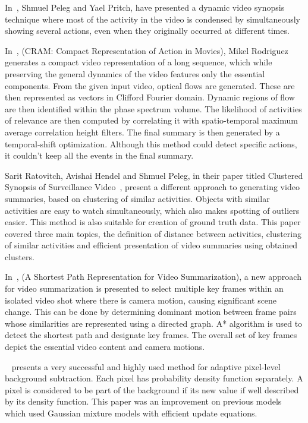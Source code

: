 In~\cite{pritch2008nonchronological}, Shmuel Peleg and Yael Pritch, have
presented a dynamic video synopsis technique where most of the activity in the
video is condensed by simultaneously showing several actions, even when they
originally occurred at different times.

In~\cite{rodriguez2010cram}, (CRAM: Compact Representation of Action in Movies),
Mikel Rodriguez generates a compact video representation of a long sequence,
which while preserving the general dynamics of the video features only the
essential components. From the given input video, optical flows are generated.
These are then represented as vectors in Clifford Fourier domain. Dynamic
regions of flow are then identified within the phase spectrum volume. The
likelihood of activities of relevance are then computed by correlating it with
spatio-temporal maximum average correlation height filters. The final summary
is then generated by a temporal-shift optimization. Although this method could
detect specific actions, it couldn’t keep all the events in the final summary.

Sarit Ratovitch, Avishai Hendel and Shmuel Peleg, in their paper titled
Clustered Synopsis of Surveillance Video~\cite{pritch2009clustered}, present a
different approach to generating video summaries, based on clustering of
similar activities. Objects with similar activities are easy to watch
simultaneously, which also makes spotting of outliers easier. This method is
also suitable for creation of ground truth data. This paper covered three main
topics, the definition of distance between activities, clustering of similar
activities and efficient presentation of video summaries using obtained
clusters.

In~\cite{porter2003shortest}, (A Shortest Path Representation for Video
Summarization), a new approach for video summarization is presented to select
multiple key frames within an isolated video shot where there is camera motion,
causing significant scene change. This can be done by determining dominant
motion between frame pairs whose similarities are represented using a directed
graph. A* algorithm is used to detect the shortest path and designate key
frames. The overall set of key frames depict the essential video content and
camera motions.

~\cite{zivkovic2004improved} presents a very successful and highly used method
for adaptive pixel-level background subtraction. Each pixel has probability
density function separately. A pixel is considered to be part of the background
if its new value if well described by its density function. This paper was an
improvement on previous models which used Gaussian mixture models with
efficient update equations.

